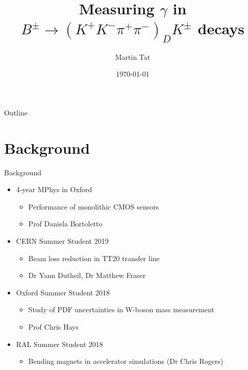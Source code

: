 \documentclass{beamer}
\title[$B^\pm\to(K^+K^-\pi^+\pi^-)_DK^\pm$]{Measuring \texorpdfstring{$\gamma$}{gamma} in \texorpdfstring{$B^\pm\to(K^+K^-\pi^+\pi^-)_DK^\pm$}{B to K+K-pi+pi-} decays}
\author{Martin Tat}
\institute{Oxford LHCb}
\date{\today}
\begin{document}
\begin{frame}
  \titlepage
\end{frame}

\begin{frame}{Outline}
  \tableofcontents
\end{frame}

\section{Background}
\begin{frame}{Background}
  \begin{itemize}
    \item 4-year MPhys in Oxford
    \begin{itemize}
      \item Performance of monolithic CMOS sensors
      \item Prof Daniela Bortoletto
    \end{itemize}
    \item CERN Summer Student 2019
    \begin{itemize}
      \item Beam loss reduction in TT$20$ transfer line
      \item Dr Yann Dutheil, Dr Matthew Fraser
    \end{itemize}
    \item Oxford Summer Student 2018
    \begin{itemize}
      \item Study of PDF uncertainties in W-boson mass measurement
      \item Prof Chris Hays
    \end{itemize}
    \item RAL Summer Student 2018
    \begin{itemize}
      \item Bending magnets in accelerator simulations (Dr Chris Rogers)
    \end{itemize}
  \end{itemize}
\end{frame}
\end{document}
